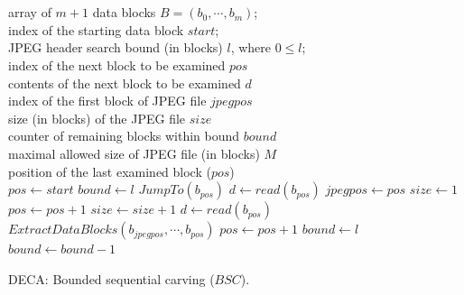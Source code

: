 \documentclass[final,5p,times,twocolumn,authoryear]{elsarticle}
\begin{document}
\begin{algorithm}[ht]
\begin{algorithmic}
    \\
    \INPUT
    \\ {array of $m+1$ data blocks $B = \left(b_0,\cdots,b_m\right)$;}
    \\ {index of the starting data block $start$;}
    \\ {JPEG header search bound (in blocks) $l$, where $0 \le l$;}
    \VARIABLES
    \\ {index of the next block to be examined $pos$}
    \\ {contents of the next block to be examined $d$}
    \\ {index of the first block of JPEG file $jpegpos$}
    \\ {size (in blocks) of the JPEG file $size$}
    \\ {counter of remaining blocks within bound $bound$}
    \CONSTANTS
    \\ {maximal allowed size of JPEG file (in blocks) $M$}
    \RETURNS
    \\ {position of the last examined block ($pos$)}
    \\
    \State $pos \gets start$
    \State $bound \gets l$
    \State $JumpTo(b_{pos})$ 
       \State $d \gets read(b_{pos})$
 	      \State $jpegpos \gets pos$
    	  \State $size \gets 1$
    	     \State $pos \gets pos+1$
    	     \State $size \gets size+1$
    	  	 \State $d \gets read(b_{pos})$
    	  \EndWhile
    	  \State $ExtractDataBlocks(b_{jpegpos},\cdots,b_{pos})$
    	  \State $pos \gets pos+1$
    	  \State $bound \gets l$  
       \Else
         \State $bound \gets bound-1$
       \EndIf
    \EndWhile
	\\
    
\end{algorithmic}
\caption{DECA: Bounded sequential carving ($BSC$).}
\label{alg:deca-bsc}
\end{algorithm}
\end{document}
